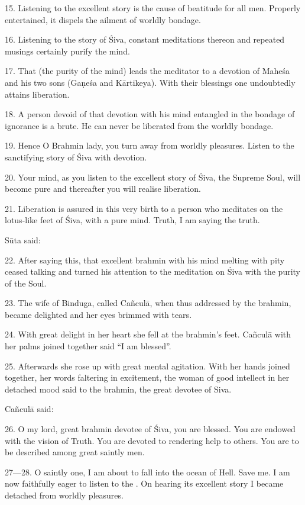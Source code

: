 15. Listening to the excellent story is the cause of beatitude for all men.
Properly entertained, it dispels the ailment of worldly bondage.

16. Listening to the story of Śiva, constant meditations thereon and repeated
musings certainly purify the mind.

17. That (the purity of the mind) leads the meditator to a devotion of Maheśa
and his two sons (Gaṇeśa and Kārtikeya). With their blessings one undoubtedly
attains liberation.

18. A person devoid of that devotion with his mind entangled in the bondage of
ignorance is a brute. He can never be liberated from the worldly bondage.

19. Hence O Brahmin lady, you turn away from worldly pleasures. Listen to the
sanctifying story of Śiva with devotion.

20. Your mind, as you listen to the excellent story of Śiva, the Supreme Soul,
will become pure and thereafter you will realise liberation.

21. Liberation is assured in this very birth to a person who meditates on the
lotus-like feet of Śiva, with a pure mind. Truth, I am saying the truth.

Sūta said:

22. After saying this, that excellent brahmin with his mind melting with pity
ceased talking and turned his attention to the meditation on Śiva with the
purity of the Soul.

23. The wife of Binduga, called Cañculā, when thus addressed by the brahmin,
became delighted and her eyes brimmed with tears.

24. With great delight in her heart she fell at the brahmin’s feet. Cañculā with
her palms joined together said “I am blessed”.

25. Afterwards she rose up with great mental agitation. With her hands joined
together, her words faltering in excitement, the woman of good intellect in her
detached mood said to the brahmin, the great devotee of Siva.

Cañculā said:

26. O my lord, great brahmin devotee of Śiva, you are blessed. You are endowed
with the vision of Truth. You are devoted to rendering help to others. You are
to be described among great saintly men.

27—28. O saintly one, I am about to fall into the ocean of Hell. Save me. I am
now faithfully eager to listen to the . On hearing its excellent
story I became detached from worldly pleasures.

